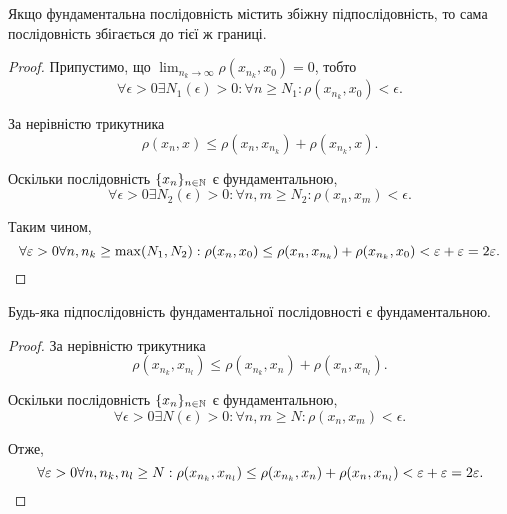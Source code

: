 \begin{lemma}
Якщо фундаментальна послідовність містить
збіжну підпослідовність, то сама послідовність збігається
до тієї ж границі.
\end{lemma}

\begin{proof}
Припустимо, що $\lim_{n_k \to \infty} \rho(x_{n_k}, x_0) = 0$, тобто
\begin{equation*}
    \forall \epsilon > 0 \exists N_1(\epsilon) > 0: \forall n \ge N_1: \rho(x_{n_k}, x_0) < \epsilon.
\end{equation*}

За нерівністю трикутника
\begin{equation*}
    \rho(x_n, x) \le \rho(x_n, x_{n_k}) + \rho(x_{n_k}, x).
\end{equation*}

Оскільки послідовність $\{x_n\}_{n \in \NN}$ є фундаментальною,
\begin{equation*}
    \forall \epsilon > 0 \exists N_2(\epsilon) > 0: \forall n, m \ge N_2: \rho(x_n, x_m) < \epsilon.
\end{equation*}

Таким чином,
\begin{equation*}
    \forall \epsilon > 0 \forall n, n_k \ge \max(N_1, N_2):
    \rho(x_n, x_0) \le \rho(x_n, x_{n_k}) + \rho(x_{n_k}, x_0) <
    \epsilon + \epsilon = 2 \epsilon. \qedhere
\end{equation*}
\end{proof}

\begin{lemma}
Будь-яка підпослідовність фундаментальної
послідовності є фундаментальною.
\end{lemma}

\begin{proof}
За нерівністю трикутника
\begin{equation*}
    \rho(x_{n_k}, x_{n_l}) \le \rho(x_{n_k}, x_n) + \rho(x_n, x_{n_l}).
\end{equation*}

Оскільки послідовність $\{x_n\}_{n \in \NN}$ є фундаментальною,
\begin{equation*}
    \forall \epsilon > 0 \exists N(\epsilon) > 0: \forall n, m \ge N: \rho(x_n, x_m) < \epsilon.
\end{equation*}

Отже,
\begin{equation*}
    \forall \epsilon > 0 \forall n, n_k, n_l \ge N:
    \rho(x_{n_k}, x_{n_l}) \le \rho(x_{n_k}, x_n) + \rho(x_n, x_{n_l})
    < \epsilon + \epsilon = 2 \epsilon. \qedhere
\end{equation*}
\end{proof}

